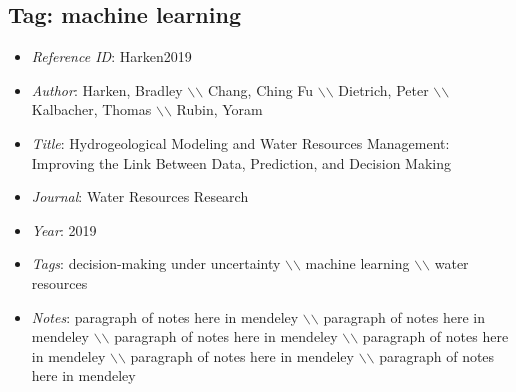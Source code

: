 \documentclass[11pt]{article}
\begin{document}
\subsection{Tag: machine learning} 
\noindent\citep{Harken2019} 
\begin{itemize} 
\item{\textit{Reference ID}:  Harken2019} 

\item{\textit{Author}:  Harken, Bradley $\backslash$$\backslash$ Chang, Ching Fu $\backslash$$\backslash$ Dietrich, Peter $\backslash$$\backslash$ Kalbacher, Thomas $\backslash$$\backslash$ Rubin, Yoram} 

\item{\textit{Title}:  Hydrogeological Modeling and Water Resources Management: Improving the Link Between Data, Prediction, and Decision Making} 

\item{\textit{Journal}:  Water Resources Research} 

\item{\textit{Year}:  2019} 

\item{\textit{Tags}:  decision-making under uncertainty $\backslash$$\backslash$ machine learning $\backslash$$\backslash$ water resources} 

\item{\textit{Notes}:  paragraph of notes here in mendeley $\backslash$$\backslash$ paragraph of notes here in mendeley $\backslash$$\backslash$ paragraph of notes here in mendeley $\backslash$$\backslash$ paragraph of notes here in mendeley $\backslash$$\backslash$ paragraph of notes here in mendeley $\backslash$$\backslash$ paragraph of notes here in mendeley} 

\end{itemize}\medskip
\end{document}

